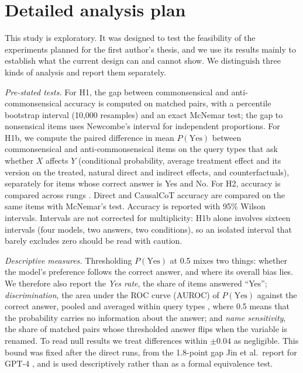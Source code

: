 
\section{Detailed analysis plan}
\label{app:analysis}

This study is exploratory. It was designed to test the feasibility of the experiments planned for the first author's thesis, and we use its results mainly to establish what the current design can and cannot show. We distinguish three kinds of analysis and report them separately.

\emph{Pre-stated tests.} For H1, the gap between commonsensical and anti-commonsensical accuracy is computed on matched pairs, with a percentile bootstrap interval (10,000 resamples) and an exact McNemar test; the gap to nonsensical items uses Newcombe's interval for independent proportions. For H1b, we compute the paired difference in mean $P(\text{Yes})$ between commonsensical and anti-commonsensical items on the query types that ask whether $X$ affects $Y$ (conditional probability, average treatment effect and its version on the treated, natural direct and indirect effects, and counterfactuals), separately for items whose correct answer is Yes and No. For H2, accuracy is compared across rungs . Direct and CausalCoT accuracy are compared on the same items with McNemar's test. Accuracy is reported with 95\% Wilson intervals. Intervals are not corrected for multiplicity: H1b alone involves sixteen intervals (four models, two answers, two conditions), so an isolated interval that barely excludes zero should be read with caution.

\emph{Descriptive measures.} Thresholding $P(\text{Yes})$ at 0.5 mixes two things: whether the model's preference follows the correct answer, and where its overall bias lies. We therefore also report the \emph{Yes rate}, the share of items answered ``Yes''; \emph{discrimination}, the area under the ROC curve (AUROC) of $P(\text{Yes})$ against the correct answer, pooled and averaged within query types , where 0.5 means that the probability carries no information about the answer; and \emph{name sensitivity}, the share of matched pairs whose thresholded answer flips when the variable is renamed. To read null results we treat differences within $\pm 0.04$ as negligible. This bound was fixed after the direct runs, from the 1.8-point gap Jin et al.\ report for GPT-4 \cite{jin2023cladder}, and is used descriptively rather than as a formal equivalence test.

